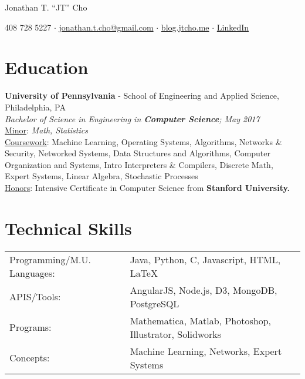 \documentclass{resume}[10pt, a4paper]
\begin{document}
\begin{center}
    \huge Jonathan T. ``JT'' Cho
\end{center}


\begin{center}
    \large 408 728 5227 $\cdot$ \href{mailto:jonathan.t.cho@gmail.com}{jonathan.t.cho@gmail.com} $\cdot$ \href{http://blog.jtcho.me}{blog.jtcho.me} $\cdot$ \href{https://www.linkedin.com/in/jtcho}{LinkedIn}
\end{center}

\section{Education}
\textbf{University of Pennsylvania} - School of Engineering and Applied Science, Philadelphia, PA\\
\textit{Bachelor of Science in Engineering in \textbf{Computer Science}; May 2017}\\
\ul{Minor}: \textit{Math, Statistics}\\
\ul{Coursework}:
Machine Learning, Operating Systems, Algorithms, Networks \& Security, Networked Systems, Data Structures and Algorithms, Computer Organization and Systems, Intro Interpreters \& Compilers, Discrete Math, Expert Systems, Linear Algebra, Stochastic Processes\\
\ul{Honors}: Intensive Certificate in Computer Science from \textbf{Stanford University.}

\section{Technical Skills}
\begin{tabular}{l l}
    Programming/M.U. Languages:&Java, Python, C, Javascript, HTML, \LaTeX\\
               APIS/Tools:&AngularJS, Node.js, D3, MongoDB, PostgreSQL\\
                 Programs:&Mathematica, Matlab, Photoshop, Illustrator, Solidworks\\
                 Concepts:&Machine Learning, Networks, Expert Systems
\end{tabular}
\end{document}
